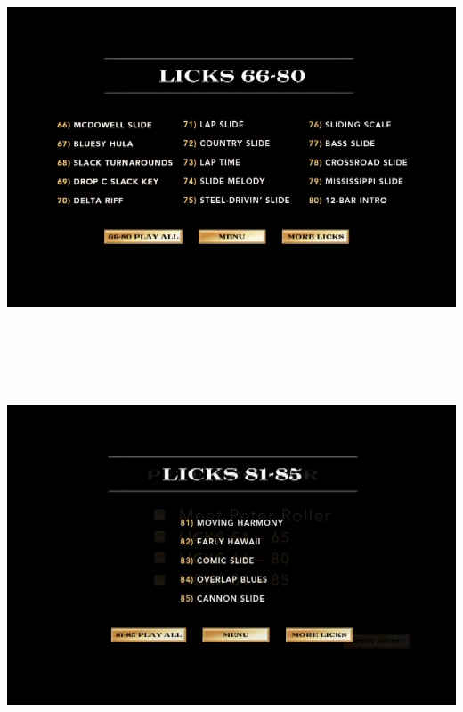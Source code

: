 \documentclass[a4paper]{book}
\begin{document}
\begin{center}
\includegraphics[width=17cm,height=11.333cm]{lebluessupportsmethodes-img6.png}
\end{center}



\clearpage

\begin{center}
\includegraphics[width=17cm,height=11.333cm]{lebluessupportsmethodes-img7.png}
\end{center}
\end{document}
